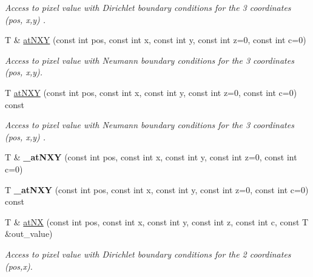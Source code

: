 \begin{DoxyCompactItemize}
\begin{DoxyCompactList}\small\item\em Access to pixel value with Dirichlet boundary conditions for the 3 coordinates ({\ttfamily pos}, {\ttfamily x},{\ttfamily y}) . \end{DoxyCompactList}\item 
T \& \hyperlink{structcimg__library__suffixed_1_1CImgList_aae3a809955c240e36a4c536c4449f571}{at\+N\+XY} (const int pos, const int x, const int y, const int z=0, const int c=0)
\begin{DoxyCompactList}\small\item\em Access to pixel value with Neumann boundary conditions for the 3 coordinates ({\ttfamily pos}, {\ttfamily x},{\ttfamily y}). \end{DoxyCompactList}\item 
\mbox{\label{structcimg__library__suffixed_1_1CImgList_aba24bac7bb5c887a9902698142728f33}} 
T \hyperlink{structcimg__library__suffixed_1_1CImgList_aba24bac7bb5c887a9902698142728f33}{at\+N\+XY} (const int pos, const int x, const int y, const int z=0, const int c=0) const
\begin{DoxyCompactList}\small\item\em Access to pixel value with Neumann boundary conditions for the 3 coordinates ({\ttfamily pos}, {\ttfamily x},{\ttfamily y}) . \end{DoxyCompactList}\item 
\mbox{\label{structcimg__library__suffixed_1_1CImgList_a6a1084bd95f7f75ec89a165ca1c63fdf}} 
T \& {\bfseries \+\_\+at\+N\+XY} (const int pos, const int x, const int y, const int z=0, const int c=0)
\item 
\mbox{\label{structcimg__library__suffixed_1_1CImgList_a89186d3f6c449fbdaaca308cb38674aa}} 
T {\bfseries \+\_\+at\+N\+XY} (const int pos, const int x, const int y, const int z=0, const int c=0) const
\item 
T \& \hyperlink{structcimg__library__suffixed_1_1CImgList_ad039c1fa9f588076cd559df640985bcb}{at\+NX} (const int pos, const int x, const int y, const int z, const int c, const T \&out\+\_\+value)
\begin{DoxyCompactList}\small\item\em Access to pixel value with Dirichlet boundary conditions for the 2 coordinates ({\ttfamily pos},{\ttfamily x}). \end{DoxyCompactList}\item 

\end{DoxyCompactItemize}
